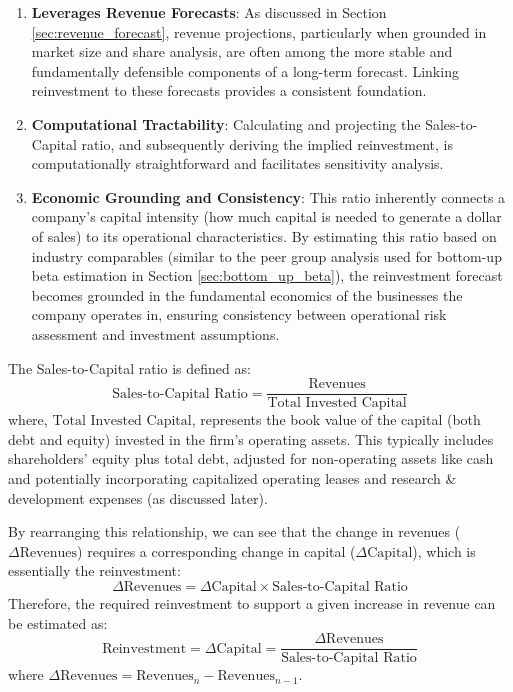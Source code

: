 \begin{enumerate}
    \item \textbf{Leverages Revenue Forecasts}: As discussed in Section \ref{sec:revenue_forecast}, revenue projections, particularly when grounded in market size and share analysis, are often among the more stable and fundamentally defensible components of a long-term forecast. Linking reinvestment to these forecasts provides a consistent foundation.
    \item \textbf{Computational Tractability}: Calculating and projecting the Sales-to-Capital ratio, and subsequently deriving the implied reinvestment, is computationally straightforward and facilitates sensitivity analysis.
    \item \textbf{Economic Grounding and Consistency}: This ratio inherently connects a company's capital intensity (how much capital is needed to generate a dollar of sales) to its operational characteristics. By estimating this ratio based on industry comparables (similar to the peer group analysis used for bottom-up beta estimation in Section \ref{sec:bottom_up_beta}), the reinvestment forecast becomes grounded in the fundamental economics of the businesses the company operates in, ensuring consistency between operational risk assessment and investment assumptions.
\end{enumerate}

The Sales-to-Capital ratio is defined as:
\begin{equation} \label{eq:sales_to_capital_ratio}
    \text{Sales-to-Capital Ratio} = \frac{\text{Revenues}}{\text{Total Invested Capital}}
\end{equation}
where, \(\text{Total Invested Capital}\), represents the book value of the capital (both debt and equity) invested in the firm's operating assets. This typically includes shareholders' equity plus total debt, adjusted for non-operating assets like cash and potentially incorporating capitalized operating leases and research \& development expenses (as discussed later).

By rearranging this relationship, we can see that the change in revenues (\(\Delta \text{Revenues}\)) requires a corresponding change in capital (\(\Delta \text{Capital}\)), which is essentially the reinvestment:
\[ \Delta \text{Revenues} = \Delta \text{Capital} \times \text{Sales-to-Capital Ratio} \]
Therefore, the required reinvestment to support a given increase in revenue can be estimated as:
\begin{equation} \label{eq:reinvestment_from_ratio}
    \text{Reinvestment} = \Delta \text{Capital} = \frac{\Delta \text{Revenues}}{\text{Sales-to-Capital Ratio}}
\end{equation}
where \(\Delta \text{Revenues} = \text{Revenues}_n - \text{Revenues}_{n-1}\).

